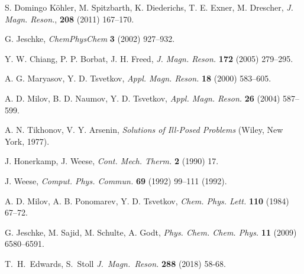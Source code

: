 \documentclass{article}
\begin{document}
\begin{thebibliography}{00}
S. Domingo K\"ohler, M. Spitzbarth, K. Diederichs, T. E. Exner, M. Drescher,
{\em J. Magn. Reson.}, {\bf 208} (2011) 167--170.

G. Jeschke,
{\em ChemPhysChem} {\bf 3} (2002) 927--932.

Y. W. Chiang, P. P. Borbat, J. H. Freed,
{\em J. Magn. Reson.} {\bf 172} (2005) 279--295.

A. G. Maryasov, Y. D. Tsvetkov, 
{\em Appl. Magn. Reson.} {\bf 18} (2000) 583--605.

A. D. Milov, B. D. Naumov, Y. D. Tsvetkov,
{\em Appl. Magn. Reson.} {\bf 26} (2004) 587--599.

A. N. Tikhonov, V. Y. Arsenin, 
{\em Solutions of Ill-Posed Problems} (Wiley, New York, 1977).

J. Honerkamp, J. Weese,
{\em Cont. Mech. Therm.} {\bf 2} (1990) 17.

J. Weese,
{\em Comput. Phys. Commun.} {\bf 69} (1992) 99--111 (1992).

A. D. Milov, A. B. Ponomarev, Y. D. Tsvetkov,
{\em Chem. Phys. Lett.} {\bf 110} (1984) 67--72.

G. Jeschke, M. Sajid, M. Schulte, A. Godt,
{\em Phys. Chem. Chem. Phys.} {\bf 11} (2009) 6580--6591.

T.~H.~Edwards, S.~Stoll
{\em J.~Magn.~Reson.} {\bf 288} (2018) 58-68.

\end{thebibliography}
\end{document}
